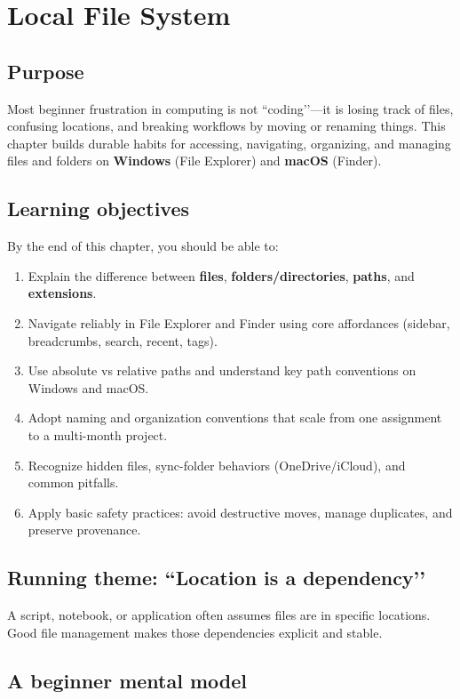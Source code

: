 \chapter{Local File System}
\label{ch:filesystem}

\section*{Purpose}
Most beginner frustration in computing is not ``coding’’—it is losing track of files, confusing locations, and breaking workflows by moving or renaming things. This chapter builds durable habits for accessing, navigating, organizing, and managing files and folders on \textbf{Windows} (File Explorer) and \textbf{macOS} (Finder).

\section*{Learning objectives}
By the end of this chapter, you should be able to:
\begin{enumerate}
\item Explain the difference between \textbf{files}, \textbf{folders/directories}, \textbf{paths}, and \textbf{extensions}.
\item Navigate reliably in File Explorer and Finder using core affordances (sidebar, breadcrumbs, search, recent, tags).
\item Use absolute vs relative paths and understand key path conventions on Windows and macOS.
\item Adopt naming and organization conventions that scale from one assignment to a multi-month project.
\item Recognize hidden files, sync-folder behaviors (OneDrive/iCloud), and common pitfalls.
\item Apply basic safety practices: avoid destructive moves, manage duplicates, and preserve provenance.
\end{enumerate}

\section*{Running theme: ``Location is a dependency’’}
A script, notebook, or application often assumes files are in specific locations. Good file management makes those dependencies explicit and stable.

\section{A beginner mental model}
